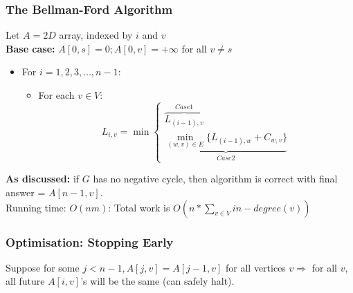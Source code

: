 \documentclass{scrartcl}
\begin{document}
 \subsubsection{The Bellman-Ford Algorithm}
 \label{sec:14-3-2}
 Let $A = 2D$ array, indexed by $i$ and $v$\\
 {\bf Base case: }
 $A[0, s] = 0; A[0, v] = +\infty$ for all $v \neq s$\\
 \begin{itemize}
 \item For $i = 1, 2, 3, \dots, n-1$:
   \begin{itemize}
   \item For each $v \in V$:
$$L_{i, v} = \min\left\{\begin{smallmatrix}
    \overbrace{L_{(i-1), v}}^{Case 1} \\
    \underbrace{\min_{(w, v) \in E} \{L_{(i-1), w} + C_{w, v} \}}_{Case2}
  \end{smallmatrix} \right. $$
\end{itemize}
\end{itemize} {\bf As discussed: } if $G$ has no negative cycle, then algorithm
is correct
with final answer = $A[n-1, v]$.\\

Running time: $O(nm)$: Total work is $O(n * \sum \limits_{v \in V} in-degree(v))$

\subsubsection{Optimisation: Stopping Early}
\label{sec:14-4-1}
Suppose for some $j < n-1, A[j, v] = A[j-1, v]$ for all vertices $v \Rightarrow$
for all $v$, all future $A[i,v]$'s will be the same (can safely halt).

\end{document}
